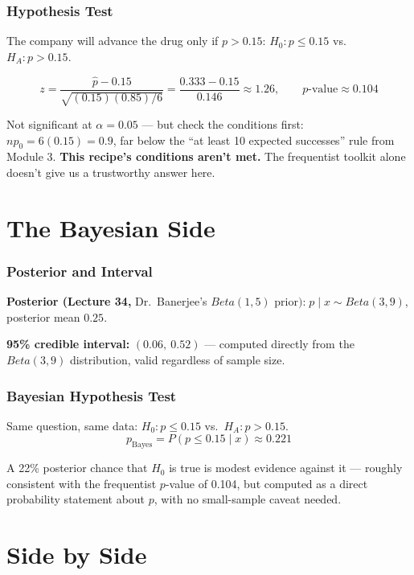 \documentclass[slidestop,compress,mathserif]{beamer}
\begin{document}
\begin{frame}
    \frametitle{Hypothesis Test}
    The company will advance the drug only if $p > 0.15$: $H_0: p\le 0.15$ vs.\ $H_A: p>0.15$.
    \pause

    \medskip
    \[
    z = \frac{\hat{p}-0.15}{\sqrt{(0.15)(0.85)/6}} = \frac{0.333-0.15}{0.146} \approx 1.26, \qquad p\text{-value} \approx 0.104
    \]
    \pause

    \medskip
    Not significant at $\alpha=0.05$ --- but check the conditions first: $n p_0 = 6(0.15) = 0.9$, far below the ``at least 10 expected successes'' rule from Module 3. \textbf{This recipe's conditions aren't met.} The frequentist toolkit alone doesn't give us a trustworthy answer here.
\end{frame}


\section{The Bayesian Side}

\begin{frame}
    \frametitle{Posterior and Interval}
    \textbf{Posterior (Lecture 34,} Dr.\ Banerjee's $Beta(1,5)$ prior$\textbf{):} \; p\mid x \sim Beta(3,9)$, posterior mean $0.25$.
    \pause

    \medskip
    \textbf{95\% credible interval:} $(0.06,\ 0.52)$ --- computed directly from the $Beta(3,9)$ distribution, valid regardless of sample size.
    \pause

    \medskip
\end{frame}

\begin{frame}
    \frametitle{Bayesian Hypothesis Test}
    Same question, same data: $H_0: p\le 0.15$ vs.\ $H_A: p>0.15$.
    \[
    p_{\text{Bayes}} = P(p\le 0.15 \mid x) \approx 0.221
    \]
    \pause

    \medskip
    A 22\% posterior chance that $H_0$ is true is modest evidence against it --- roughly consistent with the frequentist $p$-value of 0.104, but computed as a direct probability statement about $p$, with no small-sample caveat needed.
\end{frame}


\section{Side by Side}
\end{document}
